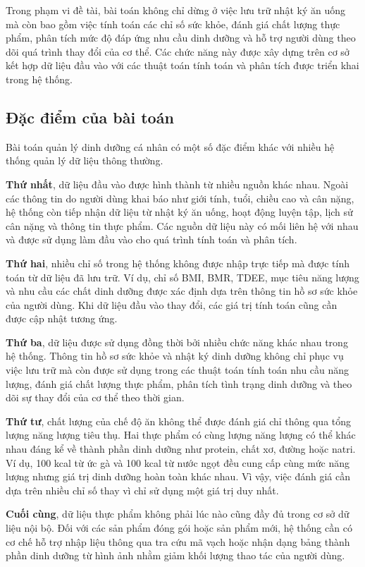 \documentclass[12pt, a4paper]{report}
\begin{document}
Trong phạm vi đề tài, bài toán không chỉ dừng ở việc lưu trữ nhật ký ăn uống mà còn bao gồm việc tính toán các chỉ số sức khỏe, đánh giá chất lượng thực phẩm, phân tích mức độ đáp ứng nhu cầu dinh dưỡng và hỗ trợ người dùng theo dõi quá trình thay đổi của cơ thể. Các chức năng này được xây dựng trên cơ sở kết hợp dữ liệu đầu vào với các thuật toán tính toán và phân tích được triển khai trong hệ thống.

\subsection{Đặc điểm của bài toán}Bài toán quản lý dinh dưỡng cá nhân có một số đặc điểm khác với nhiều hệ thống quản lý dữ liệu thông thường.

\textbf{Thứ nhất}, dữ liệu đầu vào được hình thành từ nhiều nguồn khác nhau. Ngoài các thông tin do người dùng khai báo như giới tính, tuổi, chiều cao và cân nặng, hệ thống còn tiếp nhận dữ liệu từ nhật ký ăn uống, hoạt động luyện tập, lịch sử cân nặng và thông tin thực phẩm. Các nguồn dữ liệu này có mối liên hệ với nhau và được sử dụng làm đầu vào cho quá trình tính toán và phân tích.

\textbf{Thứ hai}, nhiều chỉ số trong hệ thống không được nhập trực tiếp mà được tính toán từ dữ liệu đã lưu trữ. Ví dụ, chỉ số BMI, BMR, TDEE, mục tiêu năng lượng và nhu cầu các chất dinh dưỡng được xác định dựa trên thông tin hồ sơ sức khỏe của người dùng. Khi dữ liệu đầu vào thay đổi, các giá trị tính toán cũng cần được cập nhật tương ứng.

\textbf{Thứ ba}, dữ liệu được sử dụng đồng thời bởi nhiều chức năng khác nhau trong hệ thống. Thông tin hồ sơ sức khỏe và nhật ký dinh dưỡng không chỉ phục vụ việc lưu trữ mà còn được sử dụng trong các thuật toán tính toán nhu cầu năng lượng, đánh giá chất lượng thực phẩm, phân tích tình trạng dinh dưỡng và theo dõi sự thay đổi của cơ thể theo thời gian.

\textbf{Thứ tư}, chất lượng của chế độ ăn không thể được đánh giá chỉ thông qua tổng lượng năng lượng tiêu thụ. Hai thực phẩm có cùng lượng năng lượng có thể khác nhau đáng kể về thành phần dinh dưỡng như protein, chất xơ, đường hoặc natri. Ví dụ, 100 kcal từ ức gà và 100 kcal từ nước ngọt đều cung cấp cùng mức năng lượng nhưng giá trị dinh dưỡng hoàn toàn khác nhau. Vì vậy, việc đánh giá cần dựa trên nhiều chỉ số thay vì chỉ sử dụng một giá trị duy nhất.

\textbf{Cuối cùng}, dữ liệu thực phẩm không phải lúc nào cũng đầy đủ trong cơ sở dữ liệu nội bộ. Đối với các sản phẩm đóng gói hoặc sản phẩm mới, hệ thống cần có cơ chế hỗ trợ nhập liệu thông qua tra cứu mã vạch hoặc nhận dạng bảng thành phần dinh dưỡng từ hình ảnh nhằm giảm khối lượng thao tác của người dùng.
\end{document}
